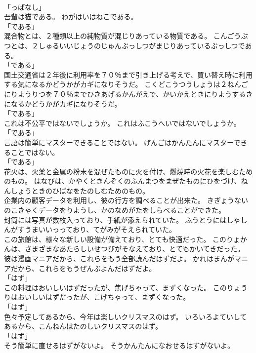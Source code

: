 \documentclass[8pt]{extreport}
\begin{document}
\begin{CJK}{UTF8}{min}
\\	「っぱなし」 
\\	吾輩は猫である。	わがはいはねこである。	
\\	「である」 
\\	混合物とは、２種類以上の純物質が混じりあっている物質である。	こんごうぶつとは、２しゅるいいじょうのじゅんぶっしつがまじりあっているぶっしつである。	
\\	「である」 
\\	国土交通省は２年後に利用率を７０％まで引き上げる考えで、買い替え時に利用する気になるかどうかがカギになりそうだ。	こくどこうつうしょうは２ねんごにりようりつを７０％までひきあげるかんがえで、かいかえときにりようするきになるかどうかがカギになりそうだ。	
\\	「である」 
\\	これは不公平ではないでしょうか。	これはふこうへいではないでしょうか。	
\\	「である」	
\\	言語は簡単にマスターできることではない。	げんごはかんたんにマスターできることではない。	
\\	「である」	
\\	花火は、火薬と金属の粉末を混ぜたものに火を付け、燃焼時の火花を楽しむためのもの。	はなびは、かやくときんぞくのふんまつをまぜたものにひをづけ、ねんしょうときのひばなをたのしむためのもの。	
\\	企業内の顧客データを利用し、彼の行方を調べることが出来た。	きぎょうないのこきゃくデータをりようし、かのなめがたをしらべることができた。	
\\	封筒には写真が数枚入っており、手紙が添えられていた。	ふうとうにはしゃしんがすうまいいっっており、てがみがそえられていた。	
\\	この旅館は、様々な新しい設備が備えており、とても快適だった。	このりょかんは、さまざまなあたらしいせつびがそなえており、とてもかいてきだった。	
\\	彼は漫画マニアだから、これらをもう全部読んだはずだよ。	かれはまんがマニアだから、これらをもうぜんぶよんだはずだよ。	
\\	「はず」 
\\	この料理はおいしいはずだったが、焦げちゃって、まずくなった。	このりょうりはおいしいはずだったが、こげちゃって、まずくなった。	
\\	「はず」 
\\	色々予定してあるから、今年は楽しいクリスマスのはず。	いろいろよていしてあるから、こんねんはたのしいクリスマスのはず。	
\\	「はず」 
\\	そう簡単に直せるはずがないよ。	そうかんたんになおせるはずがないよ。	

\end{CJK}
\end{document}
